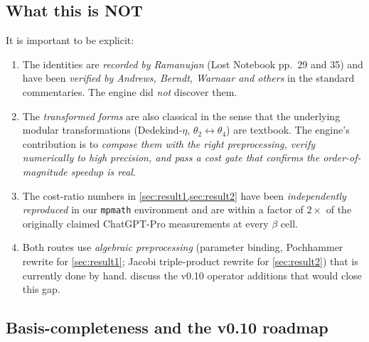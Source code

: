 \documentclass[11pt,reqno]{amsart}
\theoremstyle{definition}
\begin{document}
\subsection{What this is NOT}

It is important to be explicit:
\begin{enumerate}
\item The identities are \emph{recorded by Ramanujan} (Lost Notebook
  pp.~29 and 35) and have been \emph{verified by Andrews, Berndt,
  Warnaar and others} in the standard commentaries. The engine did
  \emph{not} discover them.
\item The \emph{transformed forms} are also classical in the sense
  that the underlying modular transformations (Dedekind-$\eta$,
  $\theta_2 \leftrightarrow \theta_4$) are textbook. The engine's
  contribution is to \emph{compose them with the right
  preprocessing, verify numerically to high precision, and pass a
  cost gate that confirms the order-of-magnitude speedup is real}.
\item The cost-ratio numbers in \cref{sec:result1,sec:result2} have
  been \emph{independently reproduced} in our \texttt{mpmath}
  environment \cite[diary~43]{ProjectC} and are within a factor of
  $2\times$ of the originally claimed ChatGPT-Pro measurements
  \cite[diary~42]{ProjectC} at every $\beta$ cell.
\item Both routes use \emph{algebraic preprocessing} (parameter
  binding, Pochhammer rewrite for \cref{sec:result1}; Jacobi
  triple-product rewrite for \cref{sec:result2}) that is currently
  done by hand.  discuss
  the v0.10 operator additions that would close this gap.
\end{enumerate}

\subsection{Basis-completeness and the v0.10 roadmap}\label{sec:roadmap}
\end{document}
